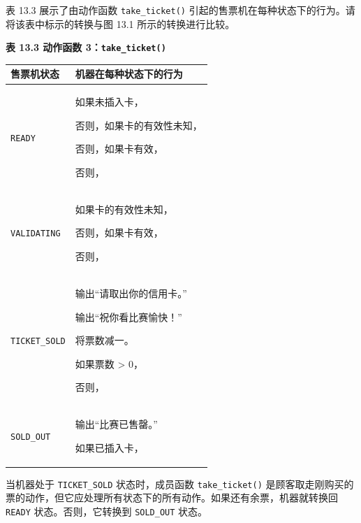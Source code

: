 表 13.3 展示了由动作函数 \texttt{take\_\allowbreak{}ticket(\allowbreak{})\allowbreak{}} 引起的售票机在每种状态下的行为。请将该表中标示的转换与图 13.1 所示的转换进行比较。

\begin{center}
{\bfseries 表 13.3 动作函数 3：\texttt{take\_\allowbreak{}ticket(\allowbreak{})\allowbreak{}}}\par\vspace{3bp}
\begin{tabularx}{\textwidth}{XX}
\toprule
售票机状态 & 机器在每种状态下的行为 \\
\midrule
\texttt{READY} & 如果未插入卡，\par 否则，如果卡的有效性未知，\par 否则，如果卡有效，\par 否则， \\
\texttt{VALIDATING} & 如果卡的有效性未知，\par 否则，如果卡有效，\par 否则， \\
\texttt{TICKET\_\allowbreak{}SOLD} & 输出“请取出你的信用卡。”\par 输出“祝你看比赛愉快！”\par 将票数减一。\par 如果票数 > 0，\par 否则， \\
\texttt{SOLD\_OUT} & 输出“比赛已售罄。”\par 如果已插入卡， \\
\bottomrule
\end{tabularx}
\end{center}

当机器处于 \texttt{TICKET\_\allowbreak{}SOLD} 状态时，成员函数 \texttt{take\_\allowbreak{}ticket(\allowbreak{})\allowbreak{}} 是顾客取走刚购买的票的动作，但它应处理所有状态下的所有动作。如果还有余票，机器就转换回 \texttt{READY} 状态。否则，它转换到 \texttt{SOLD\_OUT} 状态。

